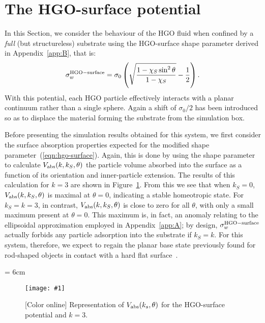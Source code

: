\documentclass[aps,10pt,twocolumn]{revtex4}
\newcommand{\lp}{\left(}
\newcommand{\rp}{\right)}
\newlength{\picW}   %
\newcommand{\pic}[1]{\texttt{[image: \#1]}}
\begin{document}
\section{The HGO-surface potential}
\label{s:RSUP}
In this Section, we consider the behaviour of the HGO fluid when confined by a \emph{full} (but
structureless) substrate using the HGO-surface shape parameter derived in Appendix~\ref{app:B}, that is:
\begin{equation}
\label{eqn:hgo-surface}
    \sigma^{\rm HGO-surface}_w = \sigma_0\lp \sqrt{\frac{1-\chi_S\sin^2\theta}{1-\chi_S}} -
    \frac{1}{2}\rp .
\end{equation}
With this potential, each HGO particle effectively interacts with a planar continuum rather than a single sphere.
Again a shift of $\sigma_0/2$ has been introduced so as to displace the material forming the substrate from the
simulation box.

Before presenting the simulation results obtained for this system, we first consider the surface absorption
properties expected for the modified shape parameter~(\ref{eqn:hgo-surface}). Again, this is done by using the
shape parameter to calculate $V_{\rm abs}(k,k_S,\theta)$ the particle volume absorbed into the surface as a
function of its orientation and inner-particle extension. The results of this calculation for $k=3$ are shown in
Figure~\ref{fig:Ve_RSUP_fks}. From this we see that when $k_S = 0$, $V_{\rm abs}(k,k_S,\theta)$ is maximal at
$\theta = 0$, indicating a stable homeotropic state. For $k_S = k=3$, in contrast, $V_{\rm abs}(k,k_S,\theta)$ is
close to zero for all $\theta$, with only a small maximum present at $\theta = 0$. This maximum is, in fact, an
anomaly relating to the ellipsoidal approximation employed in Appendix~\ref{app:A}; by design, $\sigma_w^{\rm
HGO-surface}$ actually forbids any particle adsorption into the substrate if $k_S=k$. For this system, therefore,
we expect to regain the planar base state previously found for rod-shaped objects in contact with a hard flat
surface~\cite{DijkstraVanRoij01}.

\picW = 6cm
\begin{figure}
    \centering
    \pic{fig_08.ps}
    \caption{[Color online] Representation of $V_{\rm abs}(k_s,\theta)$ for the HGO-surface potential and $k=3$.}
    \label{fig:Ve_RSUP_fks}
\end{figure}
\end{document}
